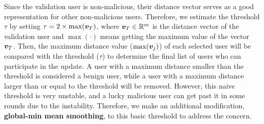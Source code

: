 \documentclass{article} %
\newcommand{\yli}[1]{{\color{cyan}#1}}
\begin{document}
\vspace{-.3cm}
Since the validation user is non-malicious, their distance vector serves as a good representation for other non-malicious users. Therefore, we estimate the threshold $\tau$ by setting $\tau=2\times\max({\bm{v}}_T)$, where ${\bm{v}}_T\in{\mathbb{R}}^m$ is the distance vector of the validation user and $\max(\cdot)$ means getting the maximum value of the vector ${\bm{v}}_T$. Then, the maximum distance value ($\max({\bm{v}}_j)$) of each selected user will be compared with the threshold ($\tau$) to determine the final list of users who can participate in the update. A user with a maximum distance smaller than the threshold is considered a benign user, while a user with a maximum distance larger than or equal to the threshold will be removed.
However, this naive threshold is very unstable, and a lucky malicious user can get past it in some rounds due to the instability. Therefore, we make an additional modification, {\bf global-min mean smoothing}, to this basic threshold to address the concern.


\end{document}
